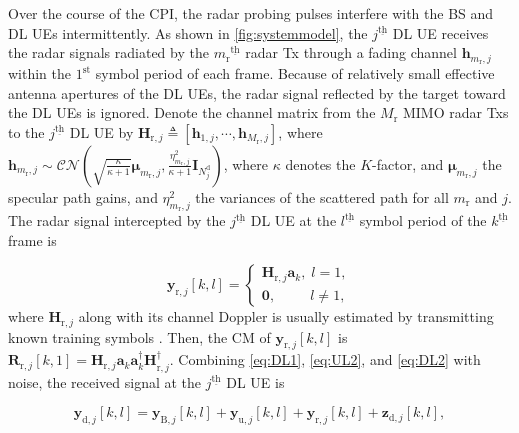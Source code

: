 \documentclass[9pt,journal]{IEEEtran}
\newcommand{\paren}[1]{\left({#1}\right)}
\newcommand{\bracket}[1]{{\left [{#1}\right ]}}
\newcommand{\ith}[1]    {{#1}^{\underline{\text{th}}}}
\newcommand{\rr}{_\mathrm{r}}
\theoremstyle{definition}
\begin{document}
Over the course of the CPI, the radar probing pulses interfere with the BS and DL UEs intermittently. As shown in \figurename{\;\ref{fig:systemmodel}}, the $\ith{j}$ DL UE receives the radar signals radiated by the $\ith{m\rr}$ radar Tx through a fading channel $\mathbf{h}_{m\rr, j}$ within the $1^{\mathrm{st}}$ symbol period of each frame. %
Because of relatively small effective antenna apertures of the DL UEs, the radar signal reflected by the target toward the DL UEs is ignored. Denote the channel matrix from the $\mathit{M}\rr$ MIMO radar Txs to the $\ith{j}$ DL UE by $\mathbf{H}_{\mathrm{r},j}\triangleq\bracket{\mathbf{h}_{\mathrm{1},j},\cdots,\mathbf{h}_{\mathit{M}\rr,j}}$, where $\mathbf{h}_{m\rr, j}\sim\mathcal{CN}\paren{\sqrt{\frac{\kappa}{\kappa+1}}\boldsymbol{\mu}_{m\rr,j},\frac{\eta^2_{m\rr,j}}{\kappa+1}\mathbf{I}_{\mathit{N}^{\textrm{d}}_j}}$, where $\kappa$ denotes the $K$-factor, and $\boldsymbol{\mu}_{m\rr,j}$ the specular path gains, and $\eta^2_{m\rr,j}$ the variances of the scattered path for all $m\rr$ and $j$. The radar signal intercepted by the $\ith{j}$ DL UE at the $\ith{l}$ symbol period of the $\ith{k}$ frame is \par\noindent\small
\begin{equation}
    \mathbf{y}_{\mathrm{r},j}\bracket{k,l}=
    \begin{cases}
    \mathbf{H}_{\mathrm{r},j}\mathbf{a}_k, \;l=1,\\
    \mathbf{0}, \qquad~~ l\neq1,
    \end{cases}\label{eq:DL2}
\end{equation}
\normalsize
where $\mathbf{H}_{\mathrm{r},j}$ along with its channel Doppler is usually estimated by transmitting known training symbols
\cite{MCMIMO_RadComm}. Then, the CM of $\mathbf{y}_{\mathrm{r},j}\bracket{k,l}$ is $\mathbf{R}_{\mathrm{r},j}\bracket{k,1}=\mathbf{H}_{\mathrm{r},j}\mathbf{a}_k\mathbf{a}^\dagger_k\mathbf{H}^\dagger_{\mathrm{r},j}$. Combining \eqref{eq:DL1}, \eqref{eq:UL2}, and \eqref{eq:DL2} with noise, the received signal at the $\ith{j}$ DL UE is\par\noindent\small
\begin{equation}
\mathbf{y}_{\textrm{d},j}\bracket{k,l}=\mathbf{y}_{\textrm{B},j}\bracket{k,l}+\mathbf{y}_{\mathrm{u},j}\bracket{k,l}+\mathbf{y}_{\mathrm{r},j}\bracket{k,l}+\mathbf{z}_{\textrm{d},j}\bracket{k,l},
\end{equation}\normalsize
\end{document}
